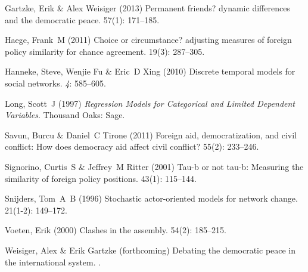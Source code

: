 \documentclass[12pt]{article}
\theoremstyle{hypothesis}
\begin{document}
\begin{thebibliography}{}
Gartzke, Erik  \& Alex Weisiger (2013) Permanent friends? dynamic differences
  and the democratic peace.
 { 57\/}(1): 171--185.

Haege, Frank~M (2011) Choice or circumstance? adjusting measures of foreign
  policy similarity for chance agreement.
 { 19\/}(3): 287--305.

Hanneke, Steve, Wenjie Fu  \& Eric~D Xing (2010) Discrete temporal models for
  social networks.
 {\em 4}: 585--605.

Long, Scott~J (1997) {\em Regression Models for Categorical and Limited
  Dependent Variables}.
\newblock Thousand Oaks: Sage.

Savun, Burcu  \& Daniel~C Tirone (2011) Foreign aid, democratization, and civil
  conflict: How does democracy aid affect civil conflict?
 { 55\/}(2): 233--246.

Signorino, Curtis~S  \& Jeffrey~M Ritter (2001) Tau-b or not tau-b: Measuring
  the similarity of foreign policy positions.
 { 43\/}(1): 115--144.

Snijders, Tom~A~B (1996) Stochastic actor-oriented models for network change.
 { 21\/}(1-2): 149--172.

Voeten, Erik (2000) Clashes in the assembly.
 { 54\/}(2): 185--215.

Weisiger, Alex  \& Erik Gartzke (forthcoming) Debating the democratic peace in
  the international system.
.

\end{thebibliography}
\end{document}
